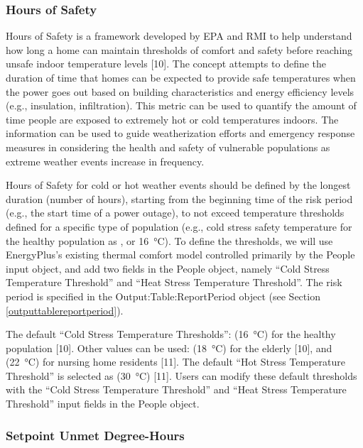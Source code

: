 \subsubsection{Hours of Safety}\label{hours-of-safety}

Hours of Safety is a framework developed by EPA and RMI to help understand how
long a home can maintain thresholds of comfort and safety before reaching unsafe
indoor temperature levels [10]. The concept attempts to define the duration of
time that homes can be expected to provide safe temperatures when the power goes
out based on building characteristics and energy efficiency levels (e.g.,
insulation, infiltration). This metric can be used to quantify the amount of
time people are exposed to extremely hot or cold temperatures indoors. The
information can be used to guide weatherization efforts and emergency response
measures in considering the health and safety of vulnerable populations as
extreme weather events increase in frequency.

Hours of Safety for cold or hot weather events should be defined by the longest
duration (number of hours), starting from the beginning time of the risk period
(e.g., the start time of a power outage), to not exceed temperature thresholds
defined for a specific type of population (e.g., cold stress safety temperature
for the healthy population as , or \SI{16}{\celsius}). To define the
thresholds, we will use EnergyPlus's existing thermal comfort model controlled
primarily by the People input object, and add two fields in the People object,
namely ``Cold Stress Temperature Threshold'' and ``Heat Stress Temperature
Threshold''. The risk period is specified in the Output:Table:ReportPeriod object
(see Section \ref{outputtablereportperiod}).

The default ``Cold Stress Temperature Thresholds'':  (\SI{16}{\celsius})
for the healthy population [10]. Other values can be used: 
(\SI{18}{\celsius}) for the elderly [10], and  (\SI{22}{\celsius}) for nursing
home residents [11]. The default ``Hot Stress Temperature Threshold'' is
selected as  (\SI{30}{\celsius}) [11]. Users can modify these default
thresholds with the ``Cold Stress Temperature Threshold'' and ``Heat Stress
Temperature Threshold'' input fields in the People object.

\subsubsection{Setpoint Unmet Degree-Hours}\label{unmet-degree-hours}

